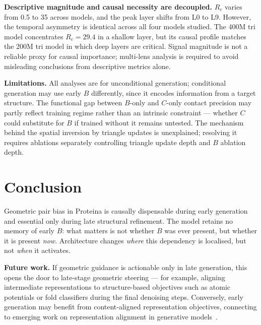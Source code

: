 \documentclass{article}
\begin{document}
\textbf{Descriptive magnitude and causal necessity are decoupled.}
$R_c$ varies from 0.5 to 35 across models, and the peak layer shifts from L0 to L9. However, the temporal asymmetry is identical across all four models studied.
The 400M tri model concentrates $R_c = 29.4$ in a shallow layer, but its causal profile matches the 200M tri model in which deep layers are critical.
Signal magnitude is not a reliable proxy for causal importance; multi-lens analysis is required to avoid misleading conclusions from descriptive metrics alone.

\textbf{Limitations.}
All analyses are for unconditional generation; conditional generation may use early $B$ differently, since it encodes information from a target structure.
The functional gap between $B$-only and $C$-only contact precision may partly reflect training regime rather than an intrinsic constraint --- whether $C$ could substitute for $B$ if trained without it remains untested.
The mechanism behind the spatial inversion by triangle updates is unexplained; resolving it requires ablations separately controlling triangle update depth and $B$ ablation depth.

\section{Conclusion}

Geometric pair bias in Proteina is causally dispensable during early generation and essential only during late structural refinement.
The model retains no memory of early $B$: what matters is not whether $B$ was ever present, but whether it is present \emph{now}.
Architecture changes \emph{where} this dependency is localised, but not \emph{when} it activates.

\textbf{Future work.}
If geometric guidance is actionable only in late generation, this opens the door to late-stage geometric steering --- for example, aligning intermediate representations to structure-based objectives such as atomic potentials or fold classifiers during the final denoising steps.
Conversely, early generation may benefit from content-aligned representation objectives, connecting to emerging work on representation alignment in generative models~\citep{yu2025repa}.
\end{document}
